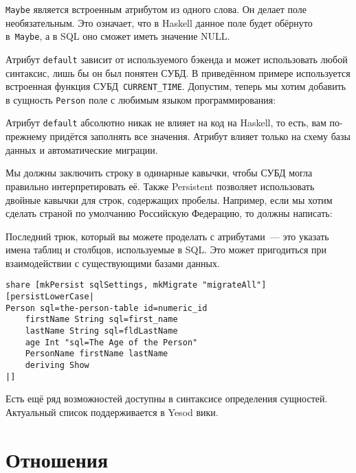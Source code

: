 
\lstinline'Maybe' является встроенным атрибутом из одного слова. Он делает поле
необязательным. Это означает, что в Haskell данное поле будет обёрнуто
в~\lstinline'Maybe', а в SQL оно сможет иметь значение NULL.

Атрибут \lstinline'default' зависит от используемого бэкенда и может
использовать любой синтаксис, лишь бы он был понятен СУБД. В приведённом
примере используется встроенная функция СУБД~\lstinline'CURRENT_TIME'.
Допустим, теперь мы хотим добавить в сущность \lstinline'Person' поле с любимым
языком программирования:


\begin{remark}
    Атрибут \lstinline'default' абсолютно никак не влияет на код на Haskell, то
    есть, вам по-прежнему придётся заполнять все значения. Атрибут влияет
    только на схему базы данных и автоматические миграции.
\end{remark}

Мы должны заключить строку в одинарные кавычки, чтобы СУБД могла правильно
интерпретировать её. Также Persistent позволяет использовать двойные кавычки
для строк, содержащих пробелы. Например, если мы хотим сделать страной по
умолчанию Российскую Федерацию, то должны написать:


Последний трюк, который вы можете проделать с атрибутами~--- это указать имена
таблиц и столбцов, используемые в SQL. Это может пригодиться при взаимодействии
с существующими базами данных.

\begin{lstlisting}
share [mkPersist sqlSettings, mkMigrate "migrateAll"] [persistLowerCase|
Person sql=the-person-table id=numeric_id
    firstName String sql=first_name
    lastName String sql=fldLastName
    age Int "sql=The Age of the Person"
    PersonName firstName lastName
    deriving Show
|]
\end{lstlisting}

Есть ещё ряд возможностей доступны в синтаксисе определения сущностей.
Актуальный список поддерживается в
%
{Yesod вики}.

\section{Отношения}

